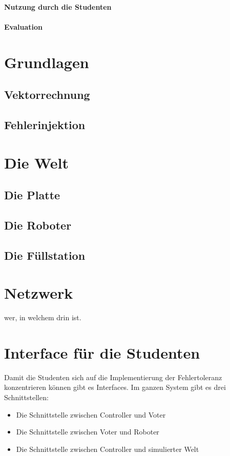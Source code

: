 \documentclass[
    12pt,
    bibliography=totoc,
    ngerman
]{scrartcl}
\begin{document}

\paragraph{Nutzung durch die Studenten} 

\paragraph{Evaluation}

\clearpage
\section{Grundlagen}

\subsection{Vektorrechnung}

\subsection{Fehlerinjektion}

\clearpage
\section{Die Welt}
\subsection{Die Platte}
\subsection{Die Roboter}
\subsection{Die F{\"{u}}llstation}

\clearpage
\section{Netzwerk}
wer, in welchem drin ist. 

\clearpage
\section{Interface f{\"{u}}r die Studenten}
Damit die Studenten sich auf die Implementierung der Fehlertoleranz konzentrieren k{\"{o}}nnen gibt es Interfaces.  
Im ganzen System gibt es drei Schnittstellen:
\begin{itemize}
\item Die Schnittstelle zwischen Controller und Voter
\item Die Schnittstelle zwischen Voter und Roboter
\item Die Schnittstelle zwischen Controller und simulierter Welt 
\end{itemize}
\end{document}

